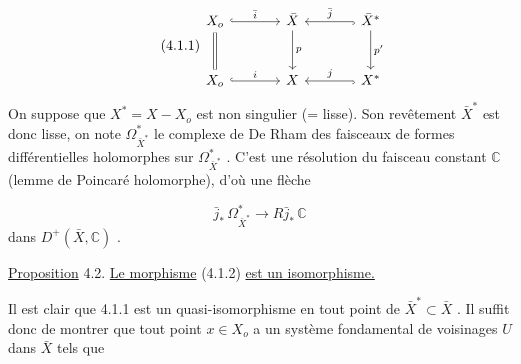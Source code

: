 \begin{equation}\tag{4.1.1}
\begin{tikzcd}[column sep=large, row sep=large]
X_o \arrow[r, hook, "\bar{i}"] \arrow[d, equal] & \bar{X} \arrow[d, "p"] & \bar{X}^* \arrow[l, hook, "\bar{j}"'] \arrow[d, "p'"] \\
X_o \arrow[r, hook, "i"] & X & X^* \arrow[l, hook, "j"']
\end{tikzcd}
\end{equation}
On suppose que $X^* = X - X_o$ est non singulier (= lisse). Son revêtement $\bar{X}^*$ est donc lisse, on note $\Omega^*_{\bar{X}^*}$ le complexe de De Rham des faisceaux de formes différentielles holomorphes sur $\Omega^*_{\bar{X}^*}$ . C'est une résolution du faisceau constant $\mathbb{C}$ (lemme de Poincaré holomorphe), d'où une flèche

\begin{equation}\tag{4.1.2}
\bar{j}_* \, \Omega^*_{\bar{X}^*} \longrightarrow R\bar{j}_* \, \mathbb{C}
\end{equation}
dans $D^+(\bar{X}, \mathbb{C})$ .

\underline{Proposition} 4.2.  \underline{Le morphisme} (4.1.2) \underline{est un isomorphisme.}

Il est clair que 4.1.1 est un quasi-isomorphisme en tout point de $\bar{X}^* \subset \bar{X}$ . Il suffit donc de montrer que tout point $x \in X_o$ a un système fondamental de voisinages $U$ dans $\bar{X}$ tels que

